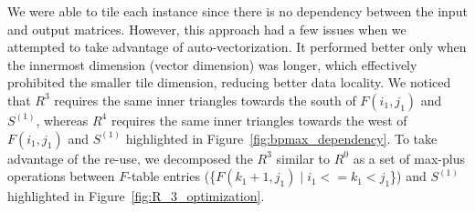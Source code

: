 We were able to tile each instance since there is no dependency between the input and output matrices. However, this approach had a few issues when we attempted to take advantage of auto-vectorization. It performed better only when the innermost dimension (vector dimension) was longer, which effectively prohibited the smaller tile dimension, reducing better data locality. We noticed that $R^3$ requires the same inner triangles towards the south of $F(i_{1}, j_{1})$ and $S^{(1)}$, whereas $R^4$ requires the same inner triangles towards the west of $F(i_{1}, j_{1})$ and $S^{(1)}$ highlighted in Figure~\ref{fig:bpmax_dependency}. To take advantage of the re-use, we decomposed the $R^3$ similar to $R^0$ as a set of max-plus operations between $F$-table entries
(\{$F(k_{1}+1, j_{1}) \mid  i_{1} <=k_{1} < j_{1}$\}) 
and $S^{(1)}$ highlighted in Figure~\ref{fig:R_3_optimization}.
